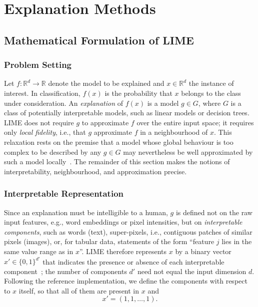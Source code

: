     \section{Explanation Methods}
    \label{sec:method}

    \subsection{Mathematical Formulation of LIME}
    \label{sec:math-lime}

    \subsubsection{Problem Setting}
    Let $f : \mathbb{R}^d \to \mathbb{R}$ denote the model to be explained and $x \in \mathbb{R}^d$ the instance of interest. In classification, $f(x)$ is the probability that $x$ belongs to the class under consideration. An \textit{explanation} of $f(x)$ is a model $g \in G$, where $G$ is a class of potentially interpretable models, such as linear models or decision trees. LIME does not require $g$ to approximate $f$ over the entire input space; it requires only \textit{local fidelity}, i.e., that $g$ approximate $f$ in a neighbourhood of $x$. This relaxation rests on the premise that a model whose global behaviour is too complex to be described by any $g \in G$ may nevertheless be well approximated by such a model locally~\cite{ribeiro-etal-2016-trust}. The remainder of this section makes the notions of interpretability, neighbourhood, and approximation precise.

    \subsubsection{Interpretable Representation}
    Since an explanation must be intelligible to a human, $g$ is defined not on the raw input features, e.g., word embeddings or pixel intensities, but on \textit{interpretable components}, such as words (text), super-pixels, i.e., contiguous patches of similar pixels (images), or, for tabular data, statements of the form ``feature $j$ lies in the same value range as in $x$''. LIME therefore represents $x$ by a binary vector $x' \in \{0, 1\}^{d'}$ that indicates the presence or absence of each interpretable component~\cite{ribeiro-etal-2016-trust}; the number of components $d'$ need not equal the input dimension $d$. Following the reference implementation, we define the components with respect to $x$ itself, so that all of them are present in $x$ and
    \begin{equation}
        x' = (1, 1, \dots, 1) .
    \end{equation}

